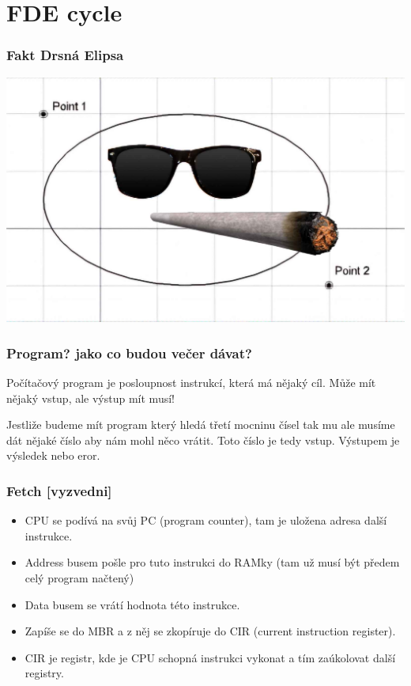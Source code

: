 \documentclass{beamer}
\begin{document}
\section{FDE cycle}
\label{sec:fde-cycle}

\begin{frame}
 \frametitle{Fakt Drsná Elipsa}
 \includegraphics[scale=0.25]{elipsa.jpg}
\end{frame}

\begin{frame}
\frametitle{Program? jako co budou večer dávat?}

\begin{block}{Počítačový program}
je posloupnost instrukcí, která má nějaký cíl. Může mít nějaký vstup, ale výstup
mít musí!
\end{block}

Jestliže budeme mít program který hledá třetí mocninu čísel tak mu ale musíme
dát nějaké číslo aby nám mohl něco vrátit. Toto číslo je tedy vstup. Výstupem je
výsledek nebo eror.
\end{frame}



\begin{frame}
	\frametitle{\textbf{F}etch [vyzvedni]}
	\begin{itemize}
		\item CPU se podívá na svůj PC (program counter), tam je uložena adresa další
		      instrukce.
		\item Address busem pošle pro tuto instrukci do RAMky (tam už musí být
		 předem celý program načtený)
		\item Data busem se vrátí hodnota této instrukce.
		\item Zapíše se do MBR a z něj se zkopíruje do CIR (current instruction
		      register).
		     \item CIR je registr, kde je CPU schopná instrukci vykonat a tím
		     	zaúkolovat další registry.
	\end{itemize}
\end{frame}
\end{document}
